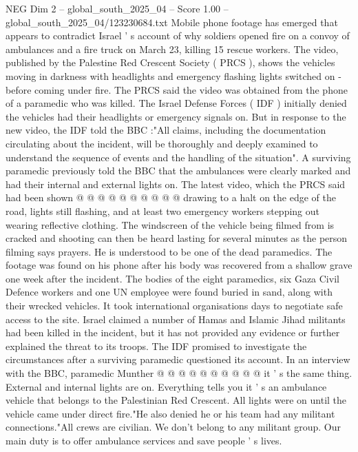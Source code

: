 \begin{textsample}{NEG Dim 2 – global\_south\_2025\_04 – Score 1.00 – global\_south\_2025\_04/123230684.txt}  \label{ex:f2_neg_100}
Mobile phone footage has emerged that appears to contradict Israel ' s account of why soldiers opened fire on a convoy of ambulances and a fire truck on March 23, killing 15 rescue workers.
The video, published by the Palestine Red Crescent Society ( PRCS ), shows the vehicles moving in darkness with headlights and emergency flashing lights switched on - before coming under fire.
The PRCS said the video was obtained from the phone of a paramedic who was killed.
The Israel Defense Forces ( IDF ) initially denied the vehicles had their headlights or emergency signals on.
But in response to the new video, the IDF told the BBC :"All claims, including the documentation circulating about the incident, will be thoroughly and deeply examined to understand the sequence of events and the handling of the situation".
A surviving paramedic previously told the BBC that the ambulances were clearly marked and had their internal and external lights on.
The latest video, which the PRCS said had been shown @ @ @ @ @ @ @ @ @ @ drawing to a halt on the edge of the road, lights still flashing, and at least two emergency workers stepping out wearing reflective clothing.
The windscreen of the vehicle being filmed from is cracked and shooting can then be heard lasting for several minutes as the person filming says prayers.
He is understood to be one of the dead paramedics.
The footage was found on his phone after his body was recovered from a shallow grave one week after the incident.
The bodies of the eight paramedics, six Gaza Civil Defence workers and one UN employee were found buried in sand, along with their wrecked vehicles.
It took international organisations days to negotiate safe access to the site.
Israel claimed a number of Hamas and Islamic Jihad militants had been killed in the incident, but it has not provided any evidence or further explained the threat to its troops.
The IDF promised to investigate the circumstances after a surviving paramedic questioned its account.
In an interview with the BBC, paramedic Munther @ @ @ @ @ @ @ @ @ @ it ' s the same thing.
External and internal lights are on.
Everything tells you it ' s an ambulance vehicle that belongs to the Palestinian Red Crescent.
All lights were on until the vehicle came under direct fire."He also denied he or his team had any militant connections."All crews are civilian.
We don't belong to any militant group.
Our main duty is to offer ambulance services and save people ' s lives.

\end{textsample}
